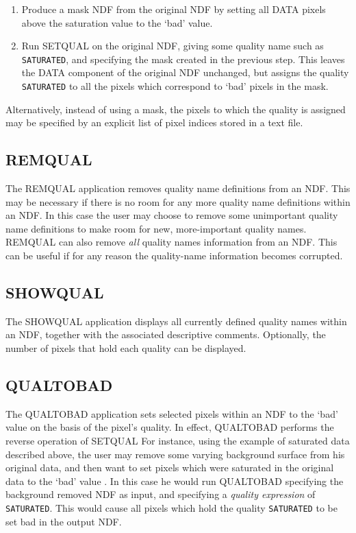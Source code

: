 \documentclass[twoside,11pt]{article}
\newcommand{\xref}[3]{#1}
\renewcommand{\_}{\texttt{\symbol{95}}}
\begin{document}
\begin{enumerate}

\item Produce a mask NDF from the original NDF by setting all DATA pixels 
above the saturation value to the `bad' value. 

\item Run SETQUAL on the original NDF, giving some quality name such as
{\tt SATURATED}, and specifying the mask created in the previous step. This
leaves the DATA component of the original NDF unchanged, but assigns the
quality {\tt SATURATED} to all the pixels which correspond to `bad'
pixels in the mask.  

\end{enumerate}

Alternatively, instead of using a mask, the pixels to which the quality is
assigned may be specified by an explicit list of pixel indices stored in a
text file.

\subsection{REMQUAL}

The \xref{REMQUAL}{sun95}{REMQUAL} application removes quality name
definitions from an NDF. This may be necessary if there is no room for
any more quality name definitions within an NDF. In this case the user
may choose to remove some unimportant quality name definitions to make
room for new, more-important quality names. REMQUAL can also remove {\em
all} quality names information from an NDF. This can be useful if for any
reason the quality-name information becomes corrupted. 

\subsection{SHOWQUAL}
The \xref{SHOWQUAL}{sun95}{SHOWQUAL} application displays all currently
defined quality names within an NDF, together with the associated
descriptive comments. Optionally, the number of pixels that hold each
quality can be displayed.

\subsection{QUALTOBAD}

The \xref{QUALTOBAD}{sun95}{QUALITYTOBAD} application sets selected
pixels within an NDF to the `bad' value on the basis of the pixel's
quality. In effect, QUALTOBAD performs the reverse operation of 
\xref{SETQUAL}{SETQUAL}. For instance, using the example of saturated
data described above, the user may remove some varying background surface
from his original data, and then want to set pixels which were saturated
in the original data to the `bad' value . In this case he would run
QUALTOBAD specifying the background removed NDF as input, and specifying
a {\em quality expression} of {\tt SATURATED}. This would cause all pixels
which hold the quality {\tt SATURATED} to be set bad in the output NDF. 
\end{document}
